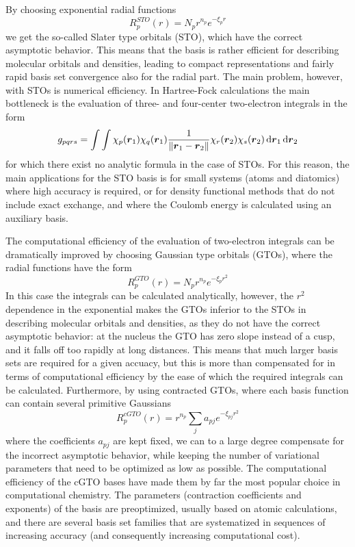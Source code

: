 By choosing exponential radial functions
\begin{equation}
    R_p^{STO}(r) = N_pr^{n_p}e^{-\xi_p r}
\end{equation}
we get the so-called Slater type orbitals (STO)\cite{Slater:1930}, which have the 
correct asymptotic behavior. This
means that the basis is rather efficient for describing molecular orbitals and densities, leading
to compact representations and fairly rapid basis set convergence also for the radial part.
The main problem, however, with STOs is numerical efficiency. In Hartree-Fock calculations the
main bottleneck is the evaluation of three- and four-center two-electron integrals in the form
\begin{equation}
    g_{pqrs} = \int\int \chi_p(\boldsymbol r_1)\chi_q(\boldsymbol r_1)\frac{1}{\|\boldsymbol r_1-\boldsymbol r_2\|}
	\chi_r(\boldsymbol r_2)\chi_s(\boldsymbol r_2) \,\mathrm{d}\boldsymbol r_1\,\mathrm{d}\boldsymbol r_2
\end{equation}
for which there exist no analytic formula in the case of STOs. For this reason, the main
applications for the STO basis is for small systems (atoms and diatomics) where high accuracy
is required, or for density functional methods that do not include exact exchange, and where 
the Coulomb energy is calculated using an auxiliary basis.

The computational efficiency of the evaluation of two-electron integrals can be dramatically 
improved by choosing Gaussian type orbitals (GTOs)\cite{Boys:1950}, where the radial 
functions have the form
\begin{equation}
    R_p^{GTO}(r) = N_pr^{n_p}e^{-\xi_p r^2}
\end{equation}
In this case the integrals can be calculated analytically, however, the $r^2$ dependence in the 
exponential makes the GTOs inferior to the STOs in describing molecular orbitals and densities,
as they do not have the correct asymptotic behavior: at the nucleus the GTO has zero slope instead
of a cusp, and it falls off too rapidly at long distances. This means that much larger basis sets
are required for a given accuacy, but this is more than compensated for in terms of computational
efficiency by the ease of which the required integrals can be calculated. Furthermore, by using
contracted GTOs, where each basis function can contain several primitive Gaussians
\begin{equation}
    R_p^{cGTO}(r) = r^{n_p}\sum_ja_{pj}e^{-\xi_{pj} r^2}
\end{equation}
where the coefficients $a_{pj}$ are kept fixed, we can to a large degree compensate for the incorrect
asymptotic behavior, while keeping the number of variational parameters that need to be optimized as
low as possible. The computational efficiency of the cGTO bases have made them by far the most
popular choice in computational chemistry. The parameters (contraction coefficients and exponents)
of the basis are preoptimized, usually based on atomic calculations, and there are several basis
set families that are systematized in sequences of increasing accuracy (and consequently 
increasing computational cost). 

